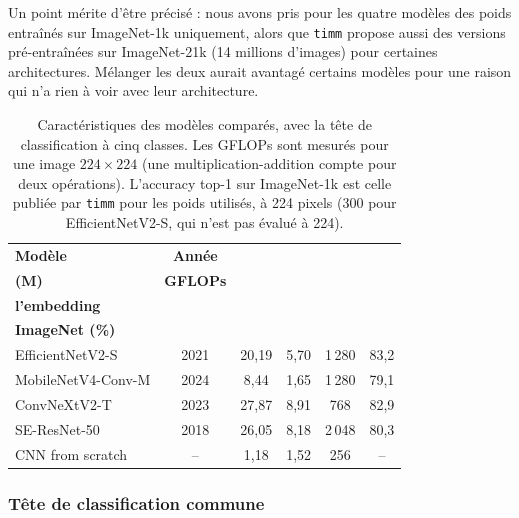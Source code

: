 Un point mérite d'être précisé : nous avons pris pour les quatre modèles des poids entraînés sur ImageNet-1k uniquement, alors que \texttt{timm} propose aussi des versions pré-entraînées sur ImageNet-21k (14 millions d'images) pour certaines architectures. Mélanger les deux aurait avantagé certains modèles pour une raison qui n'a rien à voir avec leur architecture.

\begin{table}[htbp]
\centering
\caption{Caractéristiques des modèles comparés, avec la tête de classification à cinq classes. Les GFLOPs sont mesurés pour une image $224\times224$ (une multiplication-addition compte pour deux opérations). L'accuracy top-1 sur ImageNet-1k est celle publiée par \texttt{timm} pour les poids utilisés, à 224 pixels (300 pour EfficientNetV2-S, qui n'est pas évalué à 224).}
\label{tab:models}
\small
\begin{tabular}{lccccc}
\toprule
\textbf{Modèle} & \textbf{Année} & \makecell{\textbf{Paramètres}\\\textbf{(M)}} & \textbf{GFLOPs} & \makecell{\textbf{Dimension de}\\\textbf{l'embedding}} & \makecell{\textbf{Top-1}\\\textbf{ImageNet (\%)}} \\
\midrule
EfficientNetV2-S & 2021 & 20,19 & 5,70 & 1\,280 & 83,2 \\
MobileNetV4-Conv-M & 2024 & 8,44 & 1,65 & 1\,280 & 79,1 \\
ConvNeXtV2-T & 2023 & 27,87 & 8,91 & 768 & 82,9 \\
SE-ResNet-50 & 2018 & 26,05 & 8,18 & 2\,048 & 80,3 \\
\midrule
CNN from scratch & -- & 1,18 & 1,52 & 256 & -- \\
\bottomrule
\end{tabular}
\end{table}

\subsubsection{Tête de classification commune}

